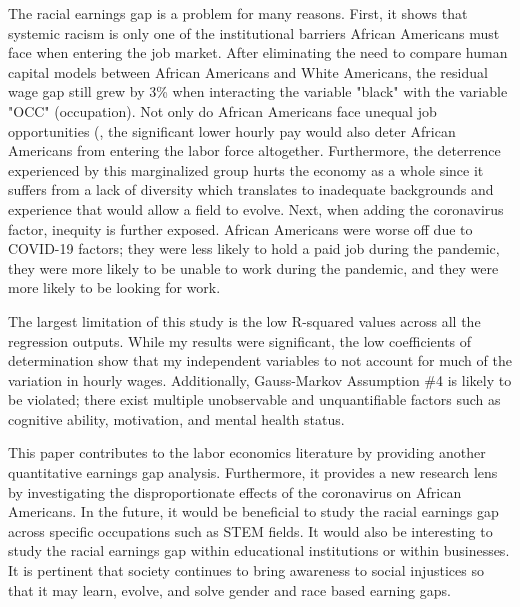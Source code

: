 \documentclass[12pt, english]{article}
\begin{document}
The racial earnings gap is a problem for many reasons. First, it shows that systemic racism is only one of the institutional barriers African Americans must face when entering the job market. After eliminating the need to compare human capital models between African Americans and White Americans, the residual wage gap still grew by 3\% when interacting the variable "black" with the variable "OCC" (occupation). Not only do African Americans face unequal job opportunities (\citet{LuLi2021}, the significant lower hourly pay would also deter African Americans from entering the labor force altogether. Furthermore, the deterrence experienced by this marginalized group hurts the economy as a whole since it suffers from a lack of diversity which translates to inadequate backgrounds and experience that would allow a field to evolve. Next, when adding the coronavirus factor, inequity is further exposed. African Americans were worse off due to COVID-19 factors; they were less likely to hold a paid job during the pandemic, they were more likely to be unable to work during the pandemic, and they were more likely to be looking for work.

The largest limitation of this study is the low R-squared values across all the regression outputs. While my results were significant, the low coefficients of determination show that my independent variables to not account for much of the variation in hourly wages. Additionally, Gauss-Markov Assumption \#4 is likely to be violated; there exist multiple unobservable and unquantifiable factors such as cognitive ability, motivation, and mental health status.

This paper contributes to the labor economics literature by providing another quantitative earnings gap analysis. Furthermore, it provides a new research lens by investigating the disproportionate effects of the coronavirus on African Americans. In the future, it would be beneficial to study the racial earnings gap across specific occupations such as STEM fields. It would also be interesting to study the racial earnings gap within educational institutions or within businesses. It is pertinent that society continues to bring awareness to social injustices so that it may learn, evolve, and solve gender and race based earning gaps.

\nocite{*}

\end{document}
